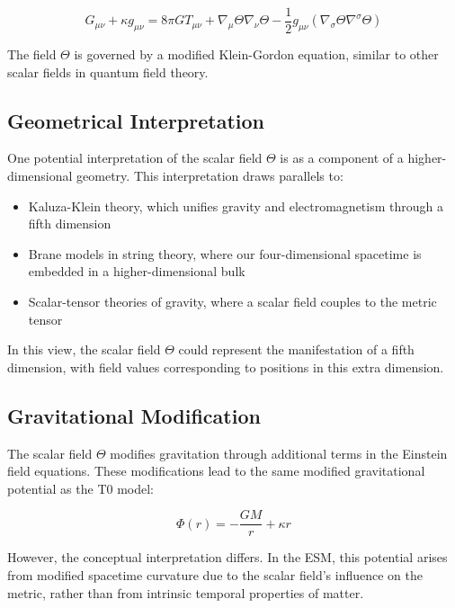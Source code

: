 \documentclass[12pt,a4paper]{article}
\begin{document}
	\begin{equation}
		G_{\mu\nu} + \kappa g_{\mu\nu} = 8\pi G T_{\mu\nu} + \nabla_{\mu}\Theta\nabla_{\nu}\Theta - \frac{1}{2}g_{\mu\nu}(\nabla_{\sigma}\Theta\nabla^{\sigma}\Theta)
	\end{equation}
	
	The field \(\Theta\) is governed by a modified Klein-Gordon equation, similar to other scalar fields in quantum field theory.
	
	\subsection{Geometrical Interpretation}
	\label{subsec:geometrical_interpretation}
	
	One potential interpretation of the scalar field \(\Theta\) is as a component of a higher-dimensional geometry. This interpretation draws parallels to:
	
	\begin{itemize}
		\item Kaluza-Klein theory, which unifies gravity and electromagnetism through a fifth dimension
		\item Brane models in string theory, where our four-dimensional spacetime is embedded in a higher-dimensional bulk
		\item Scalar-tensor theories of gravity, where a scalar field couples to the metric tensor
	\end{itemize}
	
	In this view, the scalar field \(\Theta\) could represent the manifestation of a fifth dimension, with field values corresponding to positions in this extra dimension.
	
	\subsection{Gravitational Modification}
	\label{subsec:gravitational_modification_esm}
	The scalar field \(\Theta\) modifies gravitation through additional terms in the Einstein field equations. These modifications lead to the same modified gravitational potential as the T0 model:
	
	\begin{equation}
		\Phi(r) = -\frac{GM}{r} + \kappa r
	\end{equation}
	
	However, the conceptual interpretation differs. In the ESM, this potential arises from modified spacetime curvature due to the scalar field's influence on the metric, rather than from intrinsic temporal properties of matter.
	
\end{document}
